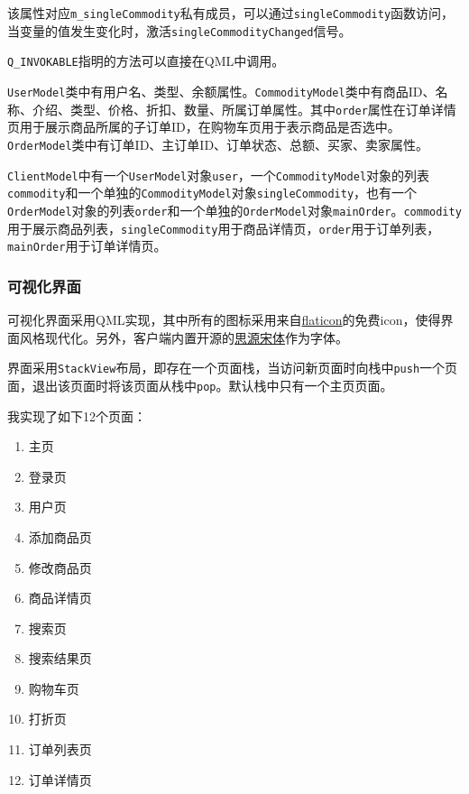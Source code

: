 \documentclass[lang=cn,11pt,a4paper,cite=authornum]{paper}
\begin{document}
该属性对应\texttt{m_singleCommodity}私有成员，可以通过\texttt{singleCommodity}函数访问，当变量的值发生变化时，激活\texttt{singleCommodityChanged}信号。

\texttt{Q_INVOKABLE}指明的方法可以直接在QML中调用。

\texttt{UserModel}类中有用户名、类型、余额属性。\texttt{CommodityModel}类中有商品ID、名称、介绍、类型、价格、折扣、数量、所属订单属性。其中\texttt{order}属性在订单详情页用于展示商品所属的子订单ID，在购物车页用于表示商品是否选中。\texttt{OrderModel}类中有订单ID、主订单ID、订单状态、总额、买家、卖家属性。

\texttt{ClientModel}中有一个\texttt{UserModel}对象\texttt{user}，一个\texttt{CommodityModel}对象的列表\texttt{commodity}和一个单独的\texttt{CommodityModel}对象\texttt{singleCommodity}，也有一个\texttt{OrderModel}对象的列表\texttt{order}和一个单独的\texttt{OrderModel}对象\texttt{mainOrder}。\texttt{commodity}用于展示商品列表，\texttt{singleCommodity}用于商品详情页，\texttt{order}用于订单列表，\texttt{mainOrder}用于订单详情页。

\subsubsection{可视化界面}

可视化界面采用QML实现，其中所有的图标采用来自\href{https://www.flaticon.com/}{flaticon}的免费icon，使得界面风格现代化。另外，客户端内置开源的\href{https://source.typekit.com/source-han-serif/cn/}{思源宋体}作为字体。

界面采用\texttt{StackView}布局，即存在一个页面栈，当访问新页面时向栈中\texttt{push}一个页面，退出该页面时将该页面从栈中\texttt{pop}。默认栈中只有一个主页页面。

我实现了如下12个页面：

\begin{enumerate}
    \item 主页
    \item 登录页
    \item 用户页
    \item 添加商品页
    \item 修改商品页
    \item 商品详情页
    \item 搜索页
    \item 搜索结果页
    \item 购物车页
    \item 打折页
    \item 订单列表页
    \item 订单详情页
\end{enumerate}
\end{document}
